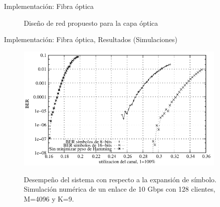 \documentclass[aspectratio=169]{beamer}
\begin{document}
\begin{frame}{Implementación: Fibra óptica}

\begin{figure}[t]
  \centering
    \qquad
    
    Diseño de red propuesto para la capa óptica
    \label{arch:fig1}
\end{figure}

\end{frame}

\begin{frame}{Implementación: Fibra óptica, Resultados (Simulaciones)}

\begin{figure}[!t]
  \centering
    \includegraphics[width=4in]{../graphs/BERvsChannelES2}
    
    Desempeño del sistema con respecto a la expansión de símbolo. Simulación numérica de un enlace de 10 Gbps con 128 clientes, M=4096 y K=9.
    \label{BERvsExpansion}
\end{figure}

\end{frame}
\end{document}
